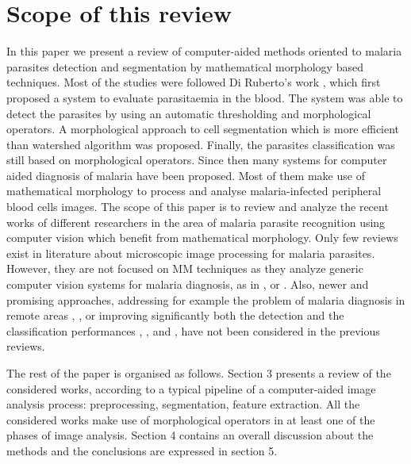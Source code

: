 \documentclass[sensors,review,submit,moreauthors,pdftex,10pt,a4paper]{mdpi}
\begin{document}
\section{Scope of this review}
In this paper we present a review of computer-aided methods oriented to malaria parasites detection and segmentation by mathematical morphology based techniques.
Most of the studies were followed Di Ruberto's work \cite{DiRuberto2002}, which first proposed a system to evaluate parasitaemia in the blood. The system was able to detect the parasites by using an automatic thresholding and morphological operators. A morphological approach to cell segmentation which is more efficient than watershed algorithm \cite{Soille2004} was proposed. Finally, the parasites classification was still based on morphological operators. Since then many systems for computer aided diagnosis of malaria have been proposed. Most of them make use of mathematical morphology to process and analyse malaria-infected peripheral blood cells images. The scope of this paper is to review and analyze the recent works of different researchers in the area of malaria parasite recognition using computer vision which benefit from mathematical morphology. Only few reviews exist in literature about microscopic image processing for malaria parasites. However, they are not focused on MM techniques as they analyze generic computer vision systems for malaria diagnosis, as in \cite{Rosado2017}, \cite{Das2015} or \cite{Tek2009}. Also, newer and promising approaches, addressing for example the problem of malaria diagnosis in remote areas \cite{Oliveira2017}, \cite{Rosado2017}, or improving significantly both the detection and the classification performances \cite{Dave2017}, \cite{Devi2017}, \cite{Somasekar2017} and \cite{Sulist2015}, have not been considered in the previous reviews.

The rest of the paper is organised as follows. Section 3 presents a review of the considered works, according to a typical pipeline of a computer-aided image analysis process: preprocessing, segmentation, feature extraction.
All the considered works make use of morphological operators in at least one of the phases of image analysis. Section 4 contains an overall discussion about the methods and the conclusions are expressed in section 5.
\end{document}
